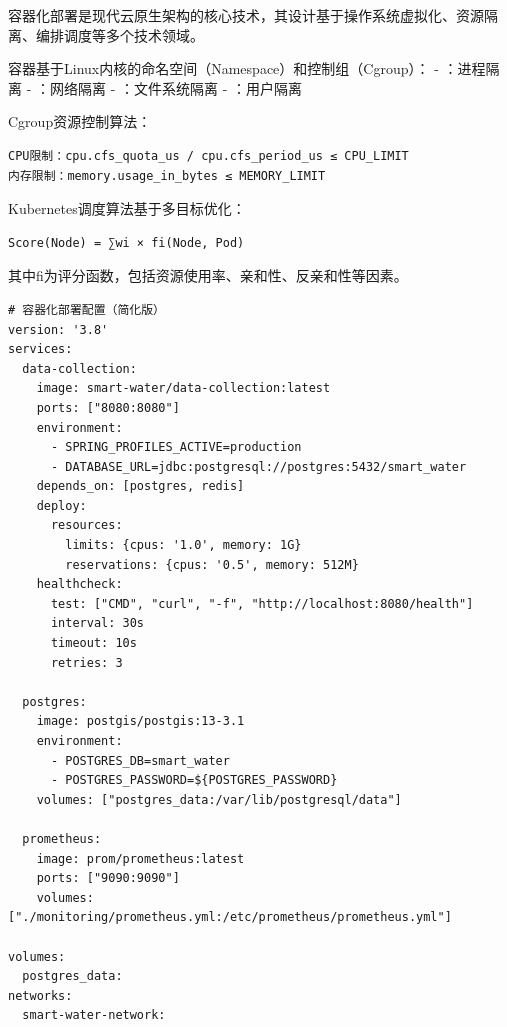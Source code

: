 
容器化部署是现代云原生架构的核心技术，其设计基于操作系统虚拟化、资源隔离、编排调度等多个技术领域。


容器基于Linux内核的命名空间（Namespace）和控制组（Cgroup）： - ：进程隔离 - ：网络隔离 - ：文件系统隔离 - ：用户隔离


Cgroup资源控制算法：

\begin{lstlisting}
CPU限制：cpu.cfs_quota_us / cpu.cfs_period_us ≤ CPU_LIMIT
内存限制：memory.usage_in_bytes ≤ MEMORY_LIMIT
\end{lstlisting}


Kubernetes调度算法基于多目标优化：

\begin{lstlisting}
Score(Node) = ∑wi × fi(Node, Pod)
\end{lstlisting}

其中fi为评分函数，包括资源使用率、亲和性、反亲和性等因素。

\begin{lstlisting}
# 容器化部署配置（简化版）
version: '3.8'
services:
  data-collection:
    image: smart-water/data-collection:latest
    ports: ["8080:8080"]
    environment:
      - SPRING_PROFILES_ACTIVE=production
      - DATABASE_URL=jdbc:postgresql://postgres:5432/smart_water
    depends_on: [postgres, redis]
    deploy:
      resources:
        limits: {cpus: '1.0', memory: 1G}
        reservations: {cpus: '0.5', memory: 512M}
    healthcheck:
      test: ["CMD", "curl", "-f", "http://localhost:8080/health"]
      interval: 30s
      timeout: 10s
      retries: 3
  
  postgres:
    image: postgis/postgis:13-3.1
    environment:
      - POSTGRES_DB=smart_water
      - POSTGRES_PASSWORD=${POSTGRES_PASSWORD}
    volumes: ["postgres_data:/var/lib/postgresql/data"]
    
  prometheus:
    image: prom/prometheus:latest
    ports: ["9090:9090"]
    volumes: ["./monitoring/prometheus.yml:/etc/prometheus/prometheus.yml"]
    
volumes:
  postgres_data:
networks:
  smart-water-network:
\end{lstlisting}

